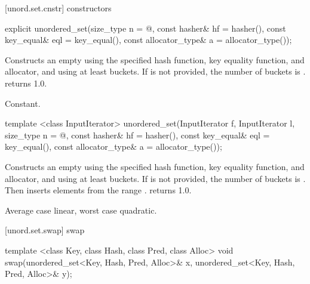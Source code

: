 [unord.set.cnstr]{ constructors}

%
\begin{itemdecl}
explicit unordered_set(size_type n = @\seebelow@,
                       const hasher& hf = hasher(),
                       const key_equal& eql = key_equal(),
                       const allocator_type& a = allocator_type());
\end{itemdecl}

\begin{itemdescr}
\pnum
\effects Constructs an empty  using the
specified hash function, key equality function, and allocator, and
using at least \textit{} buckets.  If \textit{} is not
provided, the number of buckets is .   returns 1.0.

\pnum
\complexity Constant.
\end{itemdescr}

%
\begin{itemdecl}
template <class InputIterator>
  unordered_set(InputIterator f, InputIterator l,
                size_type n = @\seebelow@,
                const hasher& hf = hasher(),
                const key_equal& eql = key_equal(),
                const allocator_type& a = allocator_type());
\end{itemdecl}

\begin{itemdescr}
\pnum
\effects Constructs an empty  using the
specified hash function, key equality function, and allocator, and
using at least \textit{} buckets. If \textit{} is not
provided, the number of buckets is . Then
inserts elements from the range \tcode{[\textit{f}, \textit{l})}.
 returns 1.0.

\pnum
\complexity Average case linear, worst case quadratic.
\end{itemdescr}

[unord.set.swap]{ swap}

%
%
\begin{itemdecl}
template <class Key, class Hash, class Pred, class Alloc>
  void swap(unordered_set<Key, Hash, Pred, Alloc>& x,
            unordered_set<Key, Hash, Pred, Alloc>& y);
\end{itemdecl}

